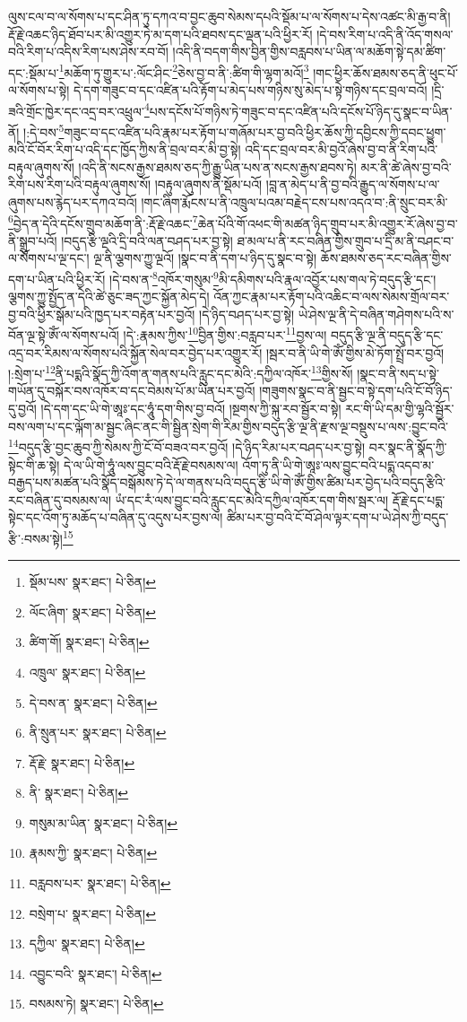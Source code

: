 ལུས་ངལ་བ་ལ་སོགས་པ་དང་ཤིན་ཏུ་དཀའ་བ་བྱང་ཆུབ་སེམས་དཔའི་སྡོམ་པ་ལ་སོགས་པ་དེས་འཚང་མི་རྒྱ་བ་ནི། རྡོ་རྗེ་འཆང་ཉིད་ཐོབ་པར་མི་འགྱུར་ཏེ་མ་དག་པའི་ཐབས་དང་ལྡན་པའི་ཕྱིར་རོ། །དེ་བས་རིག་པ་འདི་ནི་འོད་གསལ་བའི་རིག་པ་འདིས་རིག་པས་ཤེས་རབ་བོ། །འདི་ནི་བདག་གིས་བྱིན་གྱིས་བརླབས་པ་ཡིན་ལ་མཆོག་སྟེ་དམ་ཚིག་དང་:སྡོམ་པ་\footnote{སྡོམ་པས་  སྣར་ཐང་།  པེ་ཅིན། }མཆོག་ཏུ་གྱུར་པ་:ལོང་ཤིང་\footnote{ལོང་ཞིག་  སྣར་ཐང་།  པེ་ཅིན། }ཅེས་བྱ་བ་ནི་:ཚིག་གི་ལྷག་མའོ།\footnote{ཚིག་གོ།  སྣར་ཐང་།  པེ་ཅིན། } །གང་ཕྱིར་ཆོས་ཐམས་ཅད་ནི་ཕུང་པོ་ལ་སོགས་པ་སྟེ། དེ་དག་གཟུང་བ་དང་འཛིན་པའི་རྟོག་པ་མེད་པས་གཉིས་སུ་མེད་པ་སྟེ་གཉིས་དང་བྲལ་བའོ། །དྲི་ཟའི་གྲོང་ཁྱེར་དང་འདྲ་བར་འཕྲུལ་\footnote{འཁྲུལ་  སྣར་ཐང་།  པེ་ཅིན། }པས་དངོས་པོ་གཉིས་ཏེ་གཟུང་བ་དང་འཛིན་པའི་དངོས་པོ་ཉིད་དུ་སྣང་བ་ཡིན་ནོ། །:དེ་བས་\footnote{དེ་བས་ན་  སྣར་ཐང་།  པེ་ཅིན། }གཟུང་བ་དང་འཛིན་པའི་རྣམ་པར་རྟོག་པ་གཞོམ་པར་བྱ་བའི་ཕྱིར་ཆོས་ཀྱི་དབྱིངས་ཀྱི་དབང་ཕྱུག་མའི་ངོ་བོར་རིག་པ་འདི་དང་ཁྱོད་ཀྱིས་ནི་བྲལ་བར་མི་བྱ་སྟེ། འདི་དང་བྲལ་བར་མི་བྱའོ་ཞེས་བྱ་བ་ནི་རིག་པའི་བརྟུལ་ཞུགས་སོ། །འདི་ནི་སངས་རྒྱས་ཐམས་ཅད་ཀྱི་རྒྱུ་ཡིན་པས་ན་སངས་རྒྱས་ཐབས་ཏེ། མར་ནི་ཚེ་ཞེས་བྱ་བའི་རིག་པས་རིག་པའི་བརྟུལ་ཞུགས་སོ། །བརྟུལ་ཞུགས་ནི་སྡོམ་པའོ། །བླ་ན་མེད་པ་ནི་བྱ་བའི་རྒྱུད་ལ་སོགས་པ་ལ་ཞུགས་པས་རྙེད་པར་དཀའ་བའོ། །གང་ཞིག་རྨོངས་པ་ནི་འཁྲུལ་པའམ་བརྗེད་ངས་པས་འདའ་བ་:ནི་སྲུང་བར་མི་\footnote{ནི་སྲུན་པར་  སྣར་ཐང་།  པེ་ཅིན། }བྱེད་ན་དེའི་དངོས་གྲུབ་མཆོག་ནི་:རྡོ་རྗེ་འཆང་\footnote{རྡོ་རྗེ་  སྣར་ཐང་།  པེ་ཅིན། }ཆེན་པོའི་གོ་འཕང་གི་མཚན་ཉིད་གྲུབ་པར་མི་འགྱུར་རོ་ཞེས་བྱ་བ་ནི་སྒྲུབ་པའོ། །བདུད་རྩི་ལྔའི་དྲི་བའི་ལན་བཤད་པར་བྱ་སྟེ། ཐ་མལ་པ་ནི་རང་བཞིན་གྱིས་གྲུབ་པ་དྲི་མ་ནི་བཤང་བ་ལ་སོགས་པ་ལྔ་དང་། ལྔ་ནི་ལྕགས་ཀྱུ་ལྔའོ། །སྣང་བ་ནི་དག་པ་ཉིད་དུ་སྣང་བ་སྟེ། ཆོས་ཐམས་ཅད་རང་བཞིན་གྱིས་དག་པ་ཡིན་པའི་ཕྱིར་རོ། །དེ་བས་ན་\footnote{ནི་  སྣར་ཐང་།  པེ་ཅིན། }འཁོར་གསུམ་\footnote{གསུམ་མ་ཡིན་  སྣར་ཐང་།  པེ་ཅིན། }མི་དམིགས་པའི་རྣལ་འབྱོར་པས་གལ་ཏེ་བདུད་རྩི་དང་། ལྕགས་ཀྱུ་སྤྱོད་ན་དེའི་ཚེ་ཅུང་ཟད་ཀྱང་སྐྱོན་མེད་དེ། འོན་ཀྱང་རྣམ་པར་རྟོག་པའི་འཆིང་བ་ལས་སེམས་གྲོལ་བར་བྱ་བའི་ཕྱིར་སྒོམ་པའི་ཁྱད་པར་བརྟེན་པར་བྱའོ། །དེ་ཉིད་བཤད་པར་བྱ་སྟེ། ཡེ་ཤེས་ལྔ་ནི་དེ་བཞིན་གཤེགས་པའི་ས་བོན་ལྔ་སྟེ་ཨོཾ་ལ་སོགས་པའོ། །དེ་:རྣམས་ཀྱིས་\footnote{རྣམས་ཀྱི་  སྣར་ཐང་།  པེ་ཅིན། }བྱིན་གྱིས་:བརླབ་པར་\footnote{བརླབས་པར་  སྣར་ཐང་།  པེ་ཅིན། }བྱས་ལ། བདུད་རྩི་ལྔ་ནི་བདུད་རྩི་དང་འདྲ་བར་རིམས་ལ་སོགས་པའི་སྐྱོན་སེལ་བར་བྱེད་པར་འགྱུར་རོ། །སྦར་བ་ནི་ཡི་གེ་ཨོཾ་གྱིས་མེ་ཏོག་སྤྲོ་བར་བྱའོ། །:སྲེག་པ་\footnote{བསྲེག་པ་  སྣར་ཐང་།  པེ་ཅིན། }ནི་པདྨའི་སྣོད་ཀྱི་འོག་ན་གནས་པའི་རླུང་དང་མེའི་:དཀྱིལ་འཁོར་\footnote{དཀྱིལ་  སྣར་ཐང་།  པེ་ཅིན། }གྱིས་སོ། །སྣང་བ་ནི་སད་པ་སྟེ་གཡོན་དུ་བསྐོར་བས་འཁོར་བ་དང་བེམས་པོ་མ་ཡིན་པར་བྱའོ། །གཟུགས་སྣང་བ་ནི་སྦྱང་བ་སྟེ་དག་པའི་ངོ་བོ་ཉིད་དུ་བྱའོ། །དེ་དག་དང་ཡི་གེ་ཨཱཿ་དང་ཧཱུཾ་དག་གིས་བྱ་བའོ། །སྔགས་ཀྱི་སྐུ་རབ་སྦྱོར་བ་སྟེ། རང་གི་ཡི་དམ་གྱི་ལྷའི་སྦྱོར་བས་ལག་པ་དང་ལྐོག་མ་སྦྱང་ཞིང་ནང་གི་སྦྱིན་སྲེག་གི་རིམ་གྱིས་བདུད་རྩི་ལྔ་ནི་རྫས་ལྔ་བསྡུས་པ་ལས་:བྱུང་བའི་\footnote{འབྱུང་བའི་  སྣར་ཐང་།  པེ་ཅིན། }བདུད་རྩི་བྱང་ཆུབ་ཀྱི་སེམས་ཀྱི་ངོ་བོ་བཟའ་བར་བྱའོ། །དེ་ཉིད་རིམ་པར་བཤད་པར་བྱ་སྟེ། བར་སྣང་ནི་སྣོད་ཀྱི་སྟེང་གི་ཆ་སྟེ། དེ་ལ་ཡི་གེ་ཧཱུཾ་ལས་བྱུང་བའི་རྡོ་རྗེ་བསམས་ལ། འོག་ཏུ་ནི་ཡི་གེ་ཨཱཿ་ལས་བྱུང་བའི་པདྨ་འདབ་མ་བརྒྱད་པས་མཚན་པའི་སྣོད་བསྒོམས་ཏེ་དེ་ལ་གནས་པའི་བདུད་རྩི་ཡི་གེ་ཨོཾ་གྱིས་ཚིམ་པར་བྱེད་པའི་བདུད་རྩིའི་རང་བཞིན་དུ་བསམས་ལ། ཡཾ་དང་རཾ་ལས་བྱུང་བའི་རླུང་དང་མེའི་དཀྱིལ་འཁོར་དག་གིས་སྦར་ལ། རྡོ་རྗེ་དང་པདྨ་སྟེང་དང་འོག་ཏུ་མཆོད་པ་བཞིན་དུ་འདུས་པར་བྱས་ལ། ཚིམ་པར་བྱ་བའི་ངོ་བོ་ཤེལ་ལྟར་དག་པ་ཡེ་ཤེས་ཀྱི་བདུད་རྩི་:བསམ་སྟེ།\footnote{བསམས་ཏེ།  སྣར་ཐང་།  པེ་ཅིན། } 
